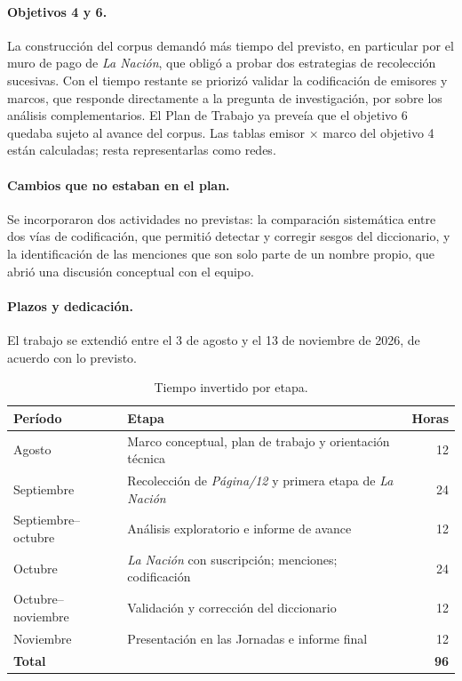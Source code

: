 \documentclass[11pt,a4paper]{article}
\newcommand{\pdoce}{\textit{Página/12}}
\newcommand{\lanac}{\textit{La Nación}}
\begin{document}
\paragraph{Objetivos 4 y 6.} La construcción del corpus demandó más tiempo del previsto, en particular por el muro de pago de \lanac{}, que obligó a probar dos estrategias de recolección sucesivas. Con el tiempo restante se priorizó validar la codificación de emisores y marcos, que responde directamente a la pregunta de investigación, por sobre los análisis complementarios. El Plan de Trabajo ya preveía que el objetivo 6 quedaba sujeto al avance del corpus. Las tablas emisor $\times$ marco del objetivo 4 están calculadas; resta representarlas como redes.

\paragraph{Cambios que no estaban en el plan.} Se incorporaron dos actividades no previstas: la comparación sistemática entre dos vías de codificación, que permitió detectar y corregir sesgos del diccionario, y la identificación de las menciones que son solo parte de un nombre propio, que abrió una discusión conceptual con el equipo.

\paragraph{Plazos y dedicación.} El trabajo se extendió entre el 3 de agosto y el 13 de noviembre de 2026, de acuerdo con lo previsto.

\begin{table}[h]
\centering\small
\caption{Tiempo invertido por etapa.}
\begin{tabular}{llr}
\toprule
\textbf{Período} & \textbf{Etapa} & \textbf{Horas} \\
\midrule
Agosto & Marco conceptual, plan de trabajo y orientación técnica & 12 \\
Septiembre & Recolección de \pdoce{} y primera etapa de \lanac{} & 24 \\
Septiembre--octubre & Análisis exploratorio e informe de avance & 12 \\
Octubre & \lanac{} con suscripción; menciones; codificación & 24 \\
Octubre--noviembre & Validación y corrección del diccionario & 12 \\
Noviembre & Presentación en las Jornadas e informe final & 12 \\
\midrule
\textbf{Total} & & \textbf{96} \\
\bottomrule
\end{tabular}
\end{table}
\end{document}
